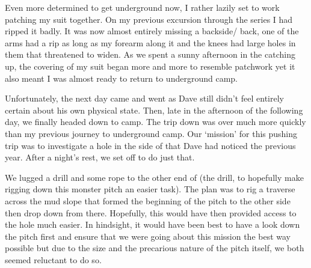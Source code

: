 Even more determined to get underground now, I rather lazily set to work
patching my suit together. On my previous excursion through the
 series I had ripped it badly. It was now almost entirely
missing a backside/ back, one of the arms had a rip as long as my
forearm along it and the knees had large holes in them that threatened
to widen. As we spent a sunny afternoon in the  catching up, the
covering of my suit began more and more to resemble patchwork yet it
also meant I was almost ready to return to underground camp.

Unfortunately, the next day came and went as Dave still didn't feel
entirely certain about his own physical state. Then, late in the
afternoon of the following day, we finally headed down to camp. The trip
down was over much more quickly than my previous journey to underground
camp. Our `mission' for this pushing trip was to investigate a hole in
the side of  that Dave had noticed the
previous year. After a night's rest, we set off to do just that.


We lugged a drill and some rope to the other end of  (the drill, to hopefully make rigging down this monster pitch
an easier task). The plan was to rig a traverse across the mud slope that
formed the beginning of the pitch to the other side then drop down from
there. Hopefully, this would have then provided access to the hole much
easier. In hindsight, it would have been best to have a look down the
pitch first and ensure that we were going about this mission the best
way possible but due to the size and the precarious nature of the pitch
itself, we both seemed reluctant to do so.




